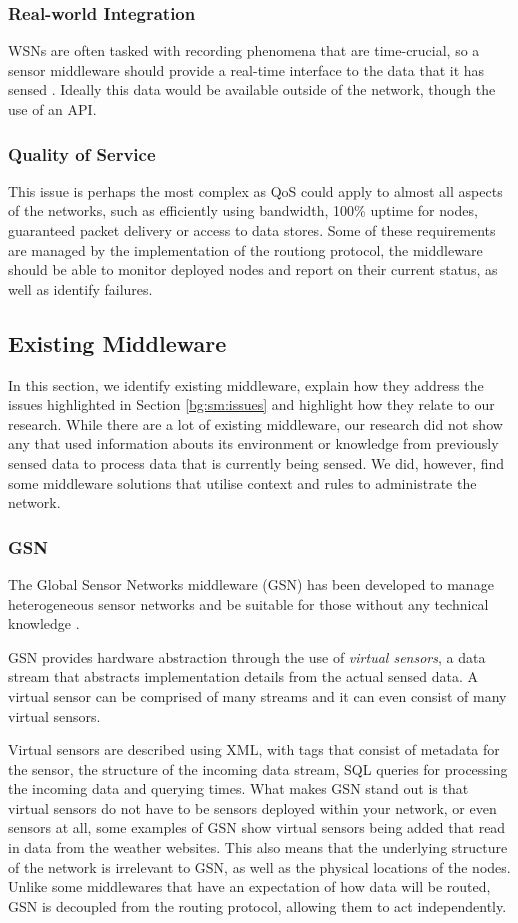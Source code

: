 	\subsubsection{Real-world Integration}
		WSNs are often tasked with recording phenomena that are time-crucial, so a sensor middleware should provide a real-time interface to the data that it has sensed \cite{F2006}. Ideally this data would be available outside of the network, though the use of an API.
	\subsubsection{Quality of Service}
		This issue is perhaps the most complex as QoS could apply to almost all aspects of the networks, such as efficiently using bandwidth, 100\% uptime for nodes, guaranteed packet delivery or access to data stores. Some of these requirements are managed by the implementation of the routiong protocol, the middleware should be able to monitor deployed nodes and report on their current status, as well as identify failures.

\subsection{Existing Middleware}\label{sec:middleware}
	In this section, we identify existing middleware, explain how they address the issues highlighted in Section \ref{bg:sm:issues} and highlight how they relate to our research. While there are a lot of existing middleware, our research did not show any that used information abouts its environment or knowledge from previously sensed data to process data that is currently being sensed. We did, however, find some middleware solutions that utilise context and rules to administrate the network.

	\subsubsection{GSN}\label{sec:GSN}
		The Global Sensor Networks middleware (GSN) has been developed to manage heterogeneous sensor networks and be suitable for those without any technical knowledge \cite{F2006}.

GSN provides hardware abstraction through the use of  \textit{virtual sensors}, a data stream that abstracts implementation details from the actual sensed data. A virtual sensor can be comprised of many streams and it can even consist of many virtual sensors. 

Virtual sensors are described using XML, with tags that consist of metadata for the sensor, the structure of the incoming data stream, SQL queries for processing the incoming data and querying times. What makes GSN stand out is that virtual sensors do not have to be sensors deployed within your network, or even sensors at all, some examples of GSN show virtual sensors being added that read in data from the weather websites. This also means that the underlying structure of the network is irrelevant to GSN, as well as the physical locations of the nodes. Unlike some middlewares that have an expectation of how data will be routed, GSN is decoupled from the routing protocol, allowing them to act independently.

